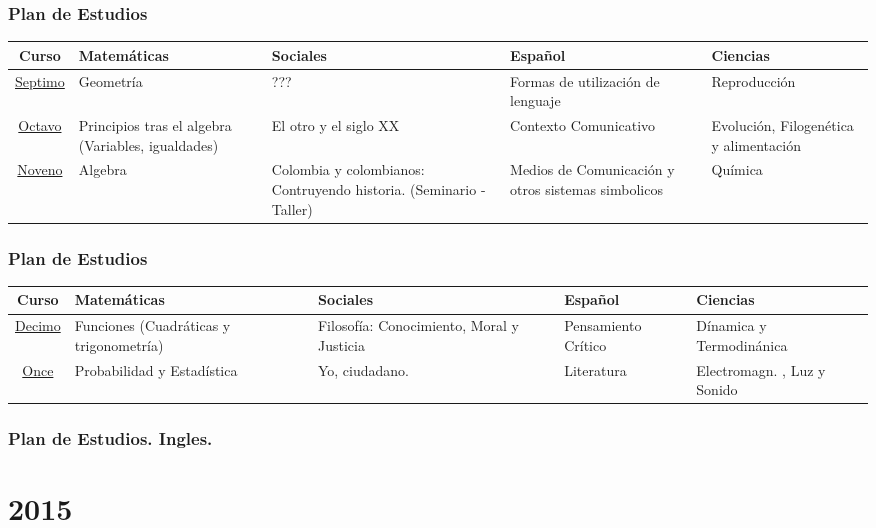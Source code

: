 \documentclass{beamer}
\begin{document}
\begin{frame}
\fontsize{9pt}{10}\selectfont
\frametitle{Plan de Estudios}
\begin{table}
\centering
\begin{tabular}{|c|p{2cm}|p{2cm}|p{2cm}|p{2cm}|}
\hline 
\textbf{Curso} & \textbf{Matem\'aticas} &\textbf{Sociales} &\textbf{Espa\~nol} & \textbf{Ciencias}\\
\hline
\underline{Septimo} & Geometr\'ia & ??? & Formas de utilizaci\'on de lenguaje & Reproducci\'on \\
\underline{Octavo} & Principios tras el algebra (Variables, igualdades)  &El otro y el siglo XX & Contexto Comunicativo  & Evoluci\'on, Filogen\'etica y  alimentaci\'on \\
\underline{Noveno} & Algebra & Colombia y colombianos: Contruyendo historia. (Seminario - Taller)  & Medios de Comunicaci\'on y otros  sistemas simbolicos & Qu\'imica \\
\hline 
\end{tabular}
\end{table}
\end{frame}
\begin{frame}
\fontsize{9pt}{10}\selectfont
\frametitle{Plan de Estudios}
\begin{table}
\centering
\begin{tabular}{|c|p{2cm}|p{2cm}|p{2cm}|p{2cm}|}
\hline 
\textbf{Curso} & \textbf{Matem\'aticas} &\textbf{Sociales} &\textbf{Espa\~nol} & \textbf{Ciencias}\\
\hline
\underline{Decimo} & Funciones (Cuadr\'aticas y trigonometr\'ia)  & Filosof\'ia: Conocimiento, Moral y Justicia & Pensamiento Cr\'itico & D\'inamica y Termodin\'anica\\
\underline{Once} & Probabilidad y Estad\'istica & Yo, ciudadano. & Literatura & Electromagn. , Luz y Sonido \\
\hline 
\end{tabular}
\end{table}
\end{frame}

\begin{frame}
\fontsize{9pt}{10}\selectfont
\frametitle{Plan de Estudios. Ingles.}
\end{frame}
\section{2015}
\end{document}
